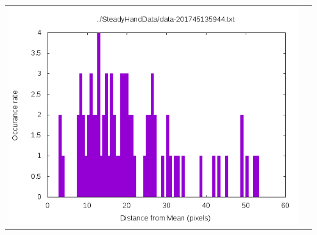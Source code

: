 \documentclass[12pt,letterpaper]{article}
\begin{document}
\begin{table}
\begin{tabular}{cc}
\includegraphics[scale=.5]{graph-data-201745135944.png}\\
\end{tabular}
\end{table}
\end{document}
